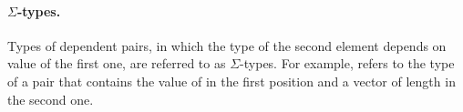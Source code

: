 \begin{figure}
\end{figure}


\paragraph{$\Sigma$-types.}
Types of dependent pairs, in which the type of the second element depends on value of the first one, are referred to as $\Sigma$-types. For example, 
refers to the type of a pair that contains the value of  in the first position and a vector of length  in the second one. 

